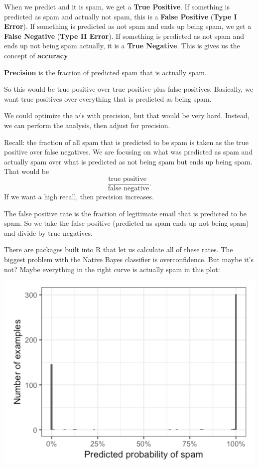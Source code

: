 When we predict and it is spam, we get a \textbf{True Positive}. If something is predicted as spam and actually not spam, this is a \textbf{False Positive} (\textbf{Type I Error}). If something is predicted as not spam and ends up being spam, we get a \textbf{False Negative} (\textbf{Type II Error}). If something is predicted as not spam and ends up not being spam actually, it is a \textbf{True Negative}. This is gives us the concept of \textbf{accuracy}

\textbf{Precision} is the fraction of predicted spam that is actually spam. 

So this would be true positive over true positive plus false positives. Basically, we want true positives over everything that is predicted as being spam. 

We could optimize the $w$'s with precision, but that would be very hard. Instead, we can perform the analysis, then adjust for precision.

Recall: the fraction of all spam that is predicted to be spam is taken as the true positive over false negatives. We are focusing on what was predicted as spam and actually spam over what is predicted as not being spam but ends up being spam. That would be $$\frac{\text{true positive }}{\text{false negative}}.$$ If we want a high recall, then precision increases. 

The false positive rate is the fraction of legitimate email that is predicted to be spam. So we take the false positive (predicted as spam ends up not being spam) and divide by true negatives. 

There are packages built into R that let us calculate all of these rates. The biggest problem with the Native Bayes classifier is overconfidence. But maybe it's not? Maybe everything in the right curve is actually spam in this plot:

\includegraphics[scale=0.40]{ask2256/figures/overconfident.png}

